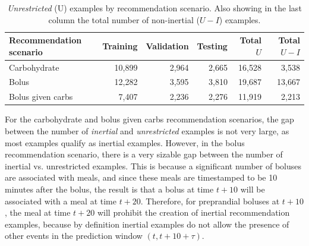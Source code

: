 \documentclass[graybox]{svmult}
\begin{document}
\begin{table}
\begin{center}
\begin{tabular}{|l|rrrr|}
\end{tabular}
\end{center}
\end{table}

\begin{table}\setlength{\tabcolsep}{4pt}
\begin{center}
\caption{{\it Unrestricted} (U) examples by recommendation scenario. Also showing in the last column the total number of non-inertial ($U - I$) examples.}
\label{tab:c2_examples}
\begin{tabular}{|l|rrrr|r|}
	\hline
	Recommendation scenario & Training & Validation & Testing & Total $U$ & Total $U - I$\\
	\hline
	Carbohydrate & 10,899 & 2,964 & 2,665 & 16,528 & 3,538\\
	Bolus & 12,282 & 3,595 & 3,810 & 19,687 & 13,667\\
	Bolus given carbs & 7,407 & 2,236 & 2,276 & 11,919 & 2,213\\
	\hline
\end{tabular}
\end{center}
\end{table}

For the carbohydrate and bolus given carbs recommendation scenarios, the gap between the number of {\it inertial} and {\it unrestricted} examples is not very large, as most examples qualify as inertial examples. However, in the bolus recommendation scenario, there is a very sizable gap between the number of inertial vs. unrestricted examples. This is because a significant number of boluses are associated with meals, and since these meals are timestamped to be 10 minutes after the bolus, the result is that a bolus at time $t + 10$ will be associated with a meal at time $t + 20$. Therefore, for preprandial boluses at $t + 10$, the meal at time $t + 20$ will prohibit the creation of inertial recommendation examples, because by definition inertial examples do not allow the presence of other events in the prediction window $(t, t + 10 + \tau)$.
\end{document}
